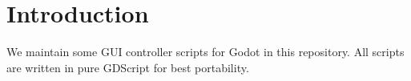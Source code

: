 \documentclass[11pt,a4paper]{report}
\begin{document}


\chapter{Introduction}
We maintain some GUI controller scripts for Godot in this repository.
All scripts are written in pure GDScript for best portability.
\end{document}
